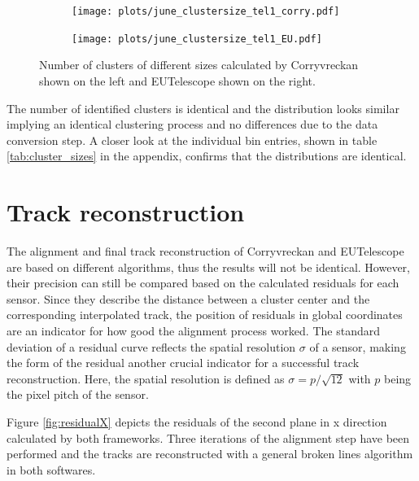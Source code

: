 \begin{figure}
  \hspace{-2.5cm}
  \begin{subfigure}{0.62\textwidth}
      \texttt{[image: plots/june\_clustersize\_tel1\_corry.pdf]}
  \end{subfigure}
  \begin{subfigure}{0.62\textwidth}
      \texttt{[image: plots/june\_clustersize\_tel1\_EU.pdf]}
  \end{subfigure}
  \caption{Number of clusters of different sizes calculated by Corryvreckan shown on the left and EUTelescope shown on the right.}
  \label{fig:cluster_size}
\end{figure}

The number of identified clusters is identical and the distribution looks similar implying an identical clustering process
and no differences due to the data conversion step. A closer look at the individual bin entries, shown in table \ref{tab:cluster_sizes} in the appendix,
confirms that the distributions are identical.

\section{Track reconstruction}
The alignment and final track reconstruction of Corryvreckan and EUTelescope are based on different algorithms, thus the
results will not be identical. However, their precision can still be compared based on the calculated residuals for each sensor.
Since they describe the distance between a cluster center and the corresponding interpolated track, the position of
residuals in global coordinates are an indicator for how good the alignment process worked. The standard deviation of a
residual curve reflects the spatial resolution $\sigma$ of a sensor, making the form of the residual another crucial indicator
for a successful track reconstruction. Here, the spatial resolution is defined as ${\sigma = p/\sqrt{12}}$ with $p$ being the
pixel pitch of the sensor.

Figure \ref{fig:residualX} depicts the residuals of the second plane in x direction calculated by both frameworks. Three iterations
of the alignment step have been performed and the tracks are reconstructed with a general broken lines algorithm in both softwares.

